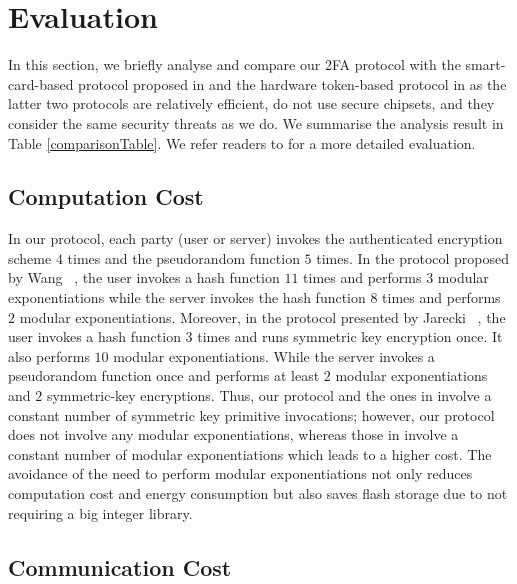 
\section{Evaluation}\label{sec:eval}

In this section, we briefly analyse and compare our 2FA protocol with the smart-card-based protocol proposed in  \cite{WangW18} and the hardware token-based protocol in \cite{JareckiJKSS21} as the latter two protocols are relatively efficient, do not use secure chipsets, and they consider the same security threats as we do. We summarise the analysis result in Table \ref{comparisonTable}. We refer readers to  for a more detailed evaluation. 




\subsection{Computation Cost}
In our protocol, each party (user or server) invokes the authenticated encryption scheme $4$ times and the pseudorandom function $5$ times. In the protocol proposed by Wang \etal~\cite{WangW18}, the user invokes a hash function $11$ times and performs $3$ modular exponentiations while the server invokes the hash function $8$ times and performs $2$ modular exponentiations. Moreover, in the protocol presented by Jarecki \etal~\cite{JareckiJKSS21}, the user invokes a hash function $3$ times and runs symmetric key encryption once. It also performs $10$ modular exponentiations. While the server invokes a pseudorandom function once and performs at least $2$ modular exponentiations and $2$ symmetric-key encryptions. Thus,  our protocol and the ones in \cite{WangW18,JareckiJKSS21} involve a constant number of symmetric key primitive invocations; however, our protocol does not involve any modular exponentiations, whereas those in  \cite{WangW18,JareckiJKSS21} involve a constant number of modular exponentiations which leads to a higher cost. 
The avoidance of the need to perform modular exponentiations not only reduces computation cost and energy consumption but also saves flash storage due to not requiring a big integer library.

\subsection{Communication Cost}

